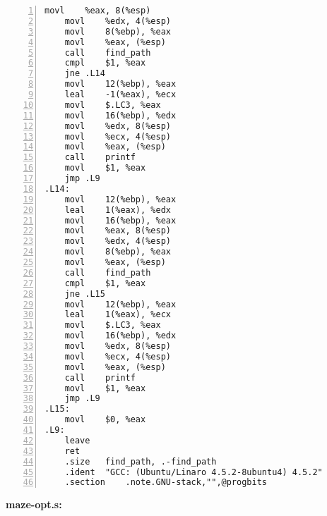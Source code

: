 \documentclass[12pt,letterpaper]{article}
\begin{document}
\begin{Verbatim}[fontsize=\relsize{-2},numbers=left]
	movl	%eax, 8(%esp)
	movl	%edx, 4(%esp)
	movl	8(%ebp), %eax
	movl	%eax, (%esp)
	call	find_path
	cmpl	$1, %eax
	jne	.L14
	movl	12(%ebp), %eax
	leal	-1(%eax), %ecx
	movl	$.LC3, %eax
	movl	16(%ebp), %edx
	movl	%edx, 8(%esp)
	movl	%ecx, 4(%esp)
	movl	%eax, (%esp)
	call	printf
	movl	$1, %eax
	jmp	.L9
.L14:
	movl	12(%ebp), %eax
	leal	1(%eax), %edx
	movl	16(%ebp), %eax
	movl	%eax, 8(%esp)
	movl	%edx, 4(%esp)
	movl	8(%ebp), %eax
	movl	%eax, (%esp)
	call	find_path
	cmpl	$1, %eax
	jne	.L15
	movl	12(%ebp), %eax
	leal	1(%eax), %ecx
	movl	$.LC3, %eax
	movl	16(%ebp), %edx
	movl	%edx, 8(%esp)
	movl	%ecx, 4(%esp)
	movl	%eax, (%esp)
	call	printf
	movl	$1, %eax
	jmp	.L9
.L15:
	movl	$0, %eax
.L9:
	leave
	ret
	.size	find_path, .-find_path
	.ident	"GCC: (Ubuntu/Linaro 4.5.2-8ubuntu4) 4.5.2"
	.section	.note.GNU-stack,"",@progbits
\end{Verbatim}
\newpage
{\bf maze-opt.s:}
\end{document}
